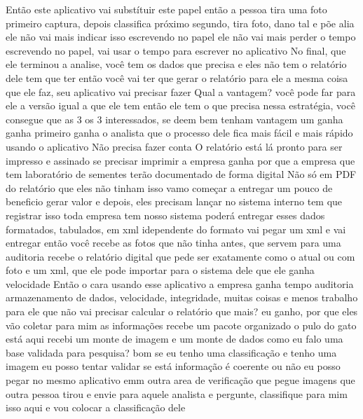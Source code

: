 Então este aplicativo vai substítuir este papel
então a pessoa tira uma foto
primeiro captura, depois classifica
próximo
segundo, tira foto, dano tal
e põe alia
ele não vai mais indicar isso escrevendo no papel
ele não vai mais perder o tempo escrevendo no papel, vai usar o tempo para escrever no aplicativo
No final, que ele terminou a analise, você tem os dados que precisa
e eles não tem o relatório dele
tem que ter
então você vai ter que gerar o relatório para ele
a mesma coisa que ele faz, seu aplicativo vai precisar fazer
Qual a vantagem?
você pode far para ele a versão igual a que ele tem
então ele tem o que precisa
nessa estratégia, você consegue que as 3
os 3
interessados, se deem bem
tenham vantagem
um ganha ganha
primeiro ganha o analista
que o processo dele fica mais fácil e mais rápido
usando o aplicativo
Não precisa fazer conta
O relatório está lá pronto para ser impresso e assinado
se precisar imprimir
a empresa ganha
por que a empresa que tem laboratório de sementes
terão documentado de forma digital
Não só em PDF do relatório
que eles não tinham isso
vamo começar a entregar um pouco de beneficio
gerar valor
e depois, eles precisam lançar no sistema interno
tem que registrar isso
toda empresa tem
nosso sistema poderá entregar esses dados formatados, tabulados, em xml idependente do formato
vai pegar um xml e vai entregar
então você recebe as fotos que não tinha antes, que servem para uma auditoria
recebe o relatório digital
que pede ser exatamente como o atual ou com foto
e um xml, que ele pode importar para o sistema dele que ele ganha velocidade
Então o cara usando esse aplicativo a empresa ganha tempo
auditoria
armazenamento de dados, velocidade, integridade, muitas coisas e menos trabalho para ele
que não vai precisar calcular o relatório
que mais?
eu ganho, por que eles vão coletar para mim as informações
recebe um pacote organizado
o pulo do gato está aqui
recebi um monte de imagem e um monte de dados
como eu falo uma base validada para pesquisa?
bom se eu tenho uma classificação e tenho uma imagem
eu posso tentar validar
se está informação é coerente ou não
eu posso pegar no mesmo aplicativo emm outra area
de verificação
que pegue imagens que outra pessoa tirou e envie para aquele analista e pergunte, classifique para mim isso aqui
e vou colocar a classificação dele
